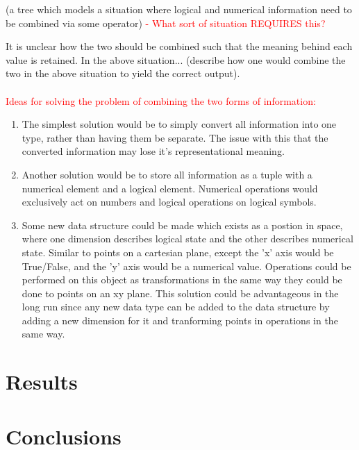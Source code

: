 \documentclass{article}
\begin{document}
(a tree which models a situation where logical and numerical information need to be combined via some operator) \textcolor{red}{- What sort of situation REQUIRES this?}

	It is unclear how the two should be combined such that the meaning behind each value is retained. In the above situation... (describe how one would combine the two in the above situation to yield the correct output). \\ \\
	
	\textcolor{red}{Ideas for solving the problem of combining the two forms of information:}
	
\begin{enumerate}

\item The simplest solution would be to simply convert all information into one type, rather than having them be separate. The issue with this that the converted information may lose it's representational meaning.

\item Another solution would be to store all information as a tuple with a numerical element and a logical element. Numerical operations would exclusively act on numbers and logical operations on logical symbols.

\item Some new data structure could be made which exists as a postion in space, where one dimension describes logical state and the other describes numerical state. Similar to points on a cartesian plane, except the 'x' axis would be True/False, and the 'y' axis would be a numerical value. Operations could be performed on this object as transformations in the same way they could be done to points on an xy plane. This solution could be advantageous in the long run since any new data type can be added to the data structure by adding a new dimension for it and tranforming points in operations in the same way.

\end{enumerate}


\section{Results}

\section{Conclusions}


\end{document}
